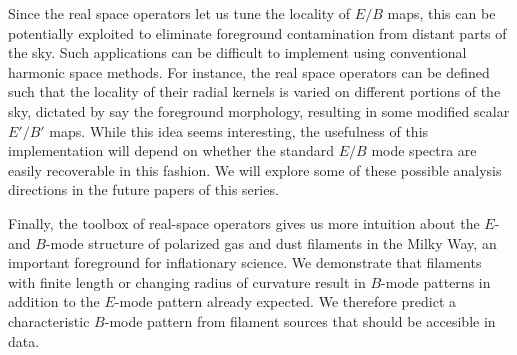 

 
Since the real space operators let us tune the locality of $E/B$ maps, this can be potentially exploited to eliminate foreground contamination from distant parts of the sky. Such applications can be difficult to implement using conventional harmonic space methods.  For instance, the real space operators can be defined such that the locality of their radial kernels is varied on different portions of the sky, dictated by say the foreground morphology, resulting in some modified scalar $E'/B'$ maps.  While this idea seems interesting, the usefulness of this implementation will depend on whether the standard $E/B$ mode spectra are easily recoverable in this fashion.  We will explore some of these possible analysis directions in the future papers of this series.

Finally, the toolbox of real-space operators gives us more intuition about the $E$- and $B$-mode structure of polarized gas and dust filaments in the Milky Way, an important foreground for inflationary science. We demonstrate that filaments with finite length or changing radius of curvature result in $B$-mode patterns in addition to the $E$-mode pattern already expected.  We therefore predict a characteristic $B$-mode pattern from filament sources that should be accesible in data.

